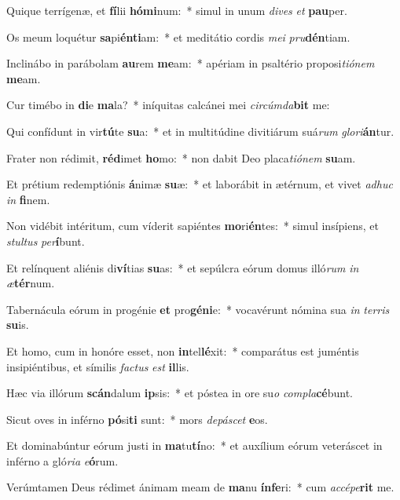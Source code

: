 \item Quique terrígenæ, et \textbf{fí}lii \textbf{hó}\textbf{mi}num:~* simul in unum \textit{di}\textit{ves} \textit{et} \textbf{pau}per.
\item Os meum loquétur \textbf{sa}pi\textbf{én}\textbf{ti}am:~* et meditátio cordis \textit{me}\textit{i} \textit{pru}\textbf{dén}tiam.
\item Inclinábo in parábolam \textbf{au}rem \textbf{me}am:~* apériam in psaltério proposi\textit{ti}\textit{ó}\textit{nem} \textbf{me}am.
\item Cur timébo in \textbf{di}e \textbf{ma}la?~* iníquitas calcánei mei \textit{cir}\textit{cúm}\textit{da}\textbf{bit} me:
\item Qui confídunt in vir\textbf{tú}te \textbf{su}a:~* et in multitúdine divitiárum suá\textit{rum} \textit{glo}\textit{ri}\textbf{án}tur.
\item Frater non rédimit, \textbf{réd}imet \textbf{ho}mo:~* non dabit Deo placa\textit{ti}\textit{ó}\textit{nem} \textbf{su}am.
\item Et prétium redemptiónis \textbf{á}nimæ \textbf{su}æ:~* et laborábit in ætérnum, et vivet \textit{ad}\textit{huc} \textit{in} \textbf{fi}nem.
\item Non vidébit intéritum, cum víderit sapiéntes \textbf{mo}ri\textbf{én}tes:~* simul insípiens, et \textit{stul}\textit{tus} \textit{per}\textbf{í}bunt.
\item Et relínquent aliénis di\textbf{ví}tias \textbf{su}as:~* et sepúlcra eórum domus illó\textit{rum} \textit{in} \textit{æ}\textbf{tér}num.
\item Tabernácula eórum in progénie \textbf{et} pro\textbf{gé}\textbf{ni}e:~* vocavérunt nómina sua \textit{in} \textit{ter}\textit{ris} \textbf{su}is.
\item Et homo, cum in honóre esset, non \textbf{in}tel\textbf{lé}xit:~* comparátus est juméntis insipiéntibus, et símilis \textit{fac}\textit{tus} \textit{est} \textbf{il}lis.
\item Hæc via illórum \textbf{scán}dalum \textbf{ip}sis:~* et póstea in ore su\textit{o} \textit{com}\textit{pla}\textbf{cé}bunt.
\item Sicut oves in inférno \textbf{pó}si\textbf{ti} sunt:~* mors \textit{de}\textit{pá}\textit{scet} \textbf{e}os.
\item Et dominabúntur eórum justi in \textbf{ma}tu\textbf{tí}no:~* et auxílium eórum veteráscet in inférno a gló\textit{ri}\textit{a} \textit{e}\textbf{ó}rum.
\item Verúmtamen Deus rédimet ánimam meam de \textbf{ma}nu \textbf{ín}\textbf{fe}ri:~* cum \textit{ac}\textit{cé}\textit{pe}\textbf{rit} me.
